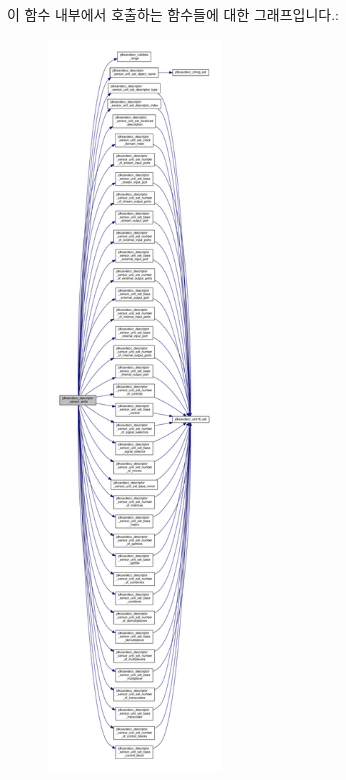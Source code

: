 이 함수 내부에서 호출하는 함수들에 대한 그래프입니다.\+:
\nopagebreak
\begin{figure}[H]
\begin{center}
\leavevmode
\includegraphics[height=550pt]{group__descriptor__sensor_ga02377b66b7ac271413654179fa9330ec_cgraph}
\end{center}
\end{figure}


